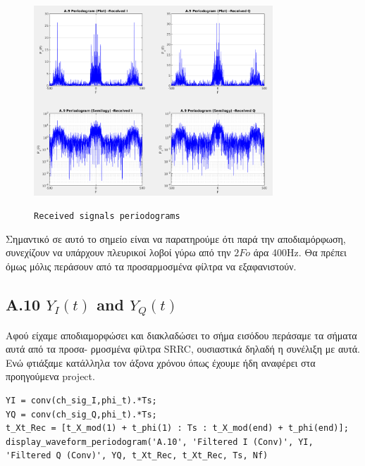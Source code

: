 \documentclass[11pt]{article}
\begin{document}
    \begin{figure}[H]
        \centering
        \includegraphics[scale=0.5, width=0.8\textwidth]{img/A9_rec_period.png} \\
        \caption{\texttt{Received signals periodograms}}
    \end{figure}
    
    \newpage \par \noindent
    Σημαντικό σε αυτό το σημείο είναι να παρατηρούμε ότι παρά την αποδιαμόρφωση, συνεχίζουν να υπάρχουν πλευρικοί λοβοί γύρω από την $2Fo$ άρα 400Hz. 
    Θα πρέπει όμως μόλις περάσουν από τα προσαρμοσμένα φίλτρα να εξαφανιστούν.
    
    \subsection*{A.10 $Y_I(t)$ and $Y_Q(t)$}
    Αφού είχαμε αποδιαμορφώσει και διακλαδώσει το σήμα εισόδου περάσαμε τα σήματα αυτά από τα προσα- ρμοσμένα φίλτρα SRRC, ουσιαστικά δηλαδή η συνέλιξη με αυτά.
    Ενώ φτιάξαμε κατάλληλα τον άξονα χρόνου όπως έχουμε ήδη αναφέρει στα προηγούμενα project.
    
    \begin{lstlisting}[caption = {A.10 \texttt{Calculate $Y_I(t)$ and $Y_Q(t)$}}]
% A.10
YI = conv(ch_sig_I,phi_t).*Ts;
YQ = conv(ch_sig_Q,phi_t).*Ts;
t_Xt_Rec = [t_X_mod(1) + t_phi(1) : Ts : t_X_mod(end) + t_phi(end)];
display_waveform_periodogram('A.10', 'Filtered I (Conv)', YI, 'Filtered Q (Conv)', YQ, t_Xt_Rec, t_Xt_Rec, Ts, Nf)
    \end{lstlisting}
    
\end{document}
